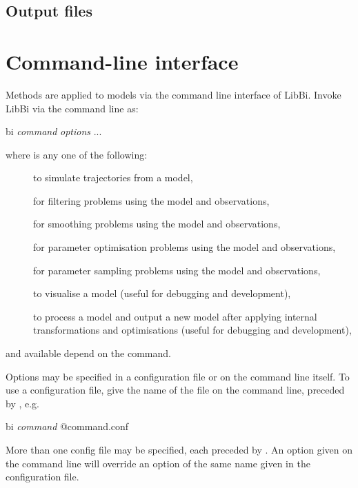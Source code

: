 \subsection{Output files}

\section{Command-line interface\label{Command_line_interface}}

Methods are applied to models via the command line interface of LibBi. Invoke LibBi
via the command line as:
\begin{cmdcode}
bi \textit{command} \textit{options} ...
\end{cmdcode}
where  is any one of the following:
\begin{description}
\item[] to simulate trajectories
  from a model,
\item[] for filtering problems using the
  model and observations,
\item[] for smoothing problems using the
  model and observations,
\item[] for parameter optimisation
  problems using the model and observations,
\item[] for parameter sampling
  problems using the model and observations,
\item[] to visualise a model (useful for
  debugging and development),
\item[] to process a model and
  output a new model after applying internal transformations and optimisations
  (useful for debugging and development),
\end{description}
and available  depend on the command.

Options may be specified in a configuration file or on the
command line itself. To use a configuration file, give the name of the file on
the command line, preceded by , e.g.
\begin{cmdcode}
bi \textit{command} @command.conf
\end{cmdcode}

More than one config file may be specified, each preceded by . An
option given on the command line will override an option of the same name
given in the configuration file.


